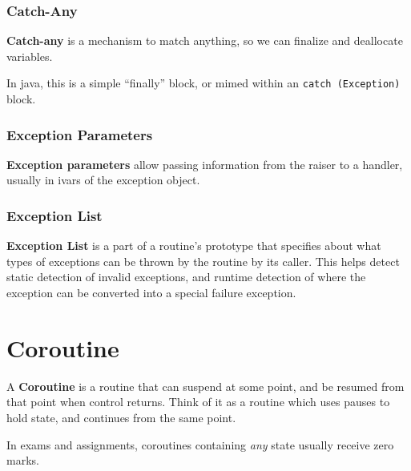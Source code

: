             \subsection{Catch-Any} %
            \label{sub:catch_any}
                \textbf{Catch-any} is a mechanism to match anything, so we can finalize and deallocate variables.

                In java, this is a simple ``finally'' block, or mimed within an \verb|catch (Exception)| block.
            \subsection{Exception Parameters} %
            \label{sub:exception_parameters}
                \textbf{Exception parameters} allow passing information from the raiser to a handler, usually in ivars of the exception object.
            \subsection{Exception List} %
            \label{sub:exception_list}
                \textbf{Exception List} is a part of a routine's prototype that specifies about what types of exceptions can be thrown by the routine by its caller.
                This helps detect static detection of invalid exceptions, and runtime detection of where the exception can be converted into a special failure exception.
    \chapter{Coroutine} %
    \label{cha:coroutine}
        A \textbf{Coroutine} is a routine that can suspend at some point, and be resumed from that point when control returns.
        Think of it as a routine which uses pauses to hold state, and continues from the same point.
        \begin{minipage}[t]{1\columnwidth}
            \begin{shaded}
                In exams and assignments, coroutines containing \textit{any} state usually receive zero marks.
            \end{shaded}
        \end{minipage}

